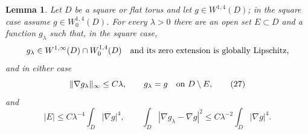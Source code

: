 \documentclass{smfart}
\newtheorem{lemma}[theorem]{Lemma}
\theoremstyle{definition}
\newcommand{\1}{\mathbf 1}
\begin{document}
\begin{lemma}\label{lem:lipschitz-truncation}
Let $D$ be a square or flat torus and let $g\in W^{1,4}(D)$; in the
square case assume $g\in W^{1,4}_ 0(D)$.  For every $\lambda>0$ there
are an open set $E\subset D$ and a function $g_ \lambda$ such that, in
the square case,
\begin{equation*}
g_ \lambda\in W^{1,\infty}(D)\cap W^{1,4}_ 0(D)
\quad\hbox{and its zero extension is globally Lipschitz},
\end{equation*}
and in either case
\begin{equation}
\|\nabla g_ \lambda\|_ \infty\leq C\lambda,\qquad
g_ \lambda=g\quad\hbox{on }D\setminus E,
\tag{27}
\end{equation}
and
\begin{equation}
|E|\leq C\lambda^{-4}\int_ D|\nabla g|^4,
\qquad
\int_ D|\nabla g_ \lambda-\nabla g|^2
\leq C\lambda^{-2}\int_ D|\nabla g|^4.
\tag{28}
\end{equation}

\end{lemma}
\end{document}
